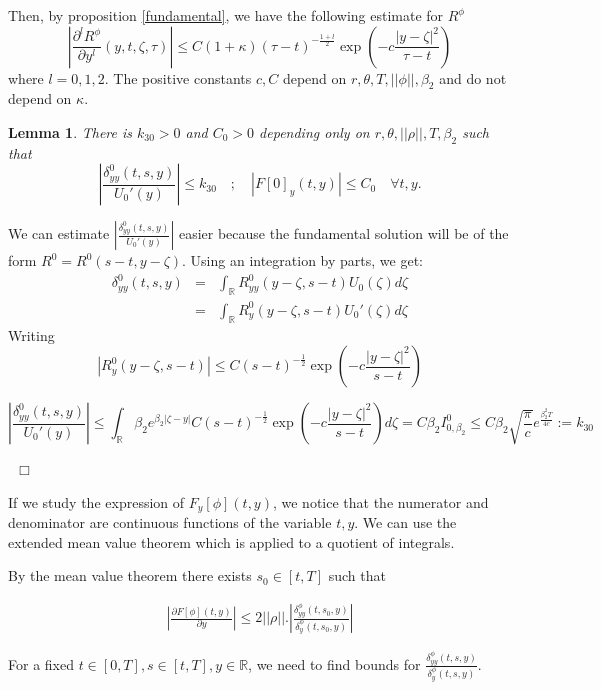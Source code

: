 \documentclass[11pt, psfig]{article}
\newtheorem{lemma}[theorem]{Lemma}
\theoremstyle{definition}
\theoremstyle{remark}
\numberwithin{equation}{section}
\def\sR{\mathbb{R}}
\def\sR{\mathbb{R}}
\newcommand{\be}{\begin{equation}}
\newcommand{\ee}{\end{equation}}
\def \ep{\hbox{ }\hfill$\Box$}
\begin{document}
Then, by proposition \ref{fundamental}, we have the following estimate for $R^{\phi}$
\be
|\frac{ \partial^l R^{\phi} }{\partial y^l} (y,t,\zeta,\tau)| \leq C (1+\kappa) (\tau-t)^{-\frac{1+l}{2}} \exp\left(-c \frac{|y-\zeta|^2}{\tau-t}\right)
\ee
where $l=0, 1, 2$. The positive constants  $c, C$ depend on $r, \theta, T, || \phi||, \beta_2$ and do not depend on $\kappa$.






\begin{lemma}\label{bound_C0}
There is $k_{30}>0$ and $C_0>0$ depending only on $r, \theta, ||\rho||, T, \beta_2$ such that
$$|\frac{\delta_{yy}^0(t,s,y)}{U_0'(y)}|\leq k_{30} \quad; \quad |F[0]_y(t,y)|\leq C_0 \quad \forall t,y. $$
\end{lemma}

We can estimate $|\frac{\delta_{yy}^0(t,s,y)}{U_0'(y)}|$ easier because the fundamental solution will be of the form $R^{0} =R^0(s-t,y-\zeta)$.
Using an integration by parts, we get:
\begin{eqnarray*}
\delta_{yy}^0(t,s,y)&=& \int_{\sR} R_{yy}^0(y-\zeta,s-t) U_0(\zeta) d\zeta \\
&=& \int_{\sR} R_y^0(y-\zeta,s-t) U_0'(\zeta) d\zeta 
\end{eqnarray*}
Writing $$|R_y^0(y-\zeta,s-t)| \leq C (s-t)^{-\frac{1}{2}} \exp(-c \frac{|y-\zeta|^2}{s-t} )$$ 

$$
 |\frac{\delta_{yy}^0(t,s,y)}{U_0'(y)} |  \leq  \int_{\sR}
 \beta_2 e^{\beta_2 |\zeta-y|} C (s-t)^{-\frac{1}{2}} \exp(-c \frac{|y-\zeta|^2}{s-t} ) d\zeta = 
  C \beta_2  I_{0,\beta_2}^0 \leq C \beta_2 \sqrt{\frac{\pi}{c}} e^{\frac{\beta_2^2 T}{4c}}:= k_{30}
$$



 

\ep


If we study the expression of $F_y[\phi](t,y)$, we notice that the numerator and denominator are continuous functions of the variable $t,y$.
We can use the extended mean value theorem which is applied to a quotient of integrals.


By the mean value theorem there exists $s_0 \in [t,T]$ such that

\begin{eqnarray*}
|\frac{\partial F[\phi](t,y)}{\partial y}| \leq 2||\rho|| . |\frac{\delta_{yy}^{\phi}(t,s_0,y)}{\delta_y^{\phi}(t,s_0,y)}|
\end{eqnarray*}

For a fixed $t\in [0,T], s\in [t,T], y\in \sR$, we need to find bounds for $\frac{ \delta_{yy}^{\phi}(t,s,y)}{\delta_y^{\phi}(t,s,y) } $.
\end{document}
